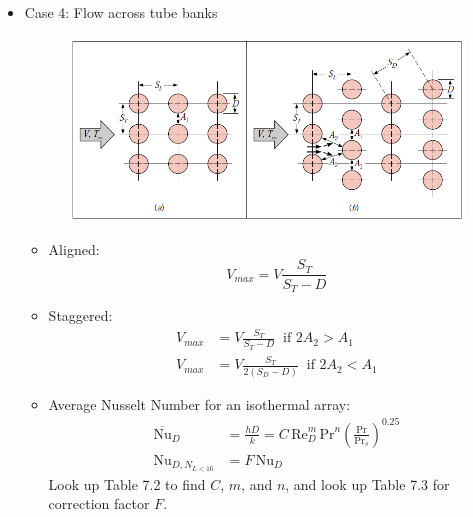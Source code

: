 \begin{itemize}
    \item Case 4: \color{red} Flow across tube banks \color{black}
    \begin{figure}[H]
        \centering
        \includegraphics[width=1.0\linewidth]{images/tube_bank.png}
    \end{figure}
    \begin{itemize}
        \item Aligned:
        \begin{equation*}
            V_{max} = V \frac{S_T}{S_T-D}
        \end{equation*}
        \item Staggered:
        \begin{align*}
            V_{max} &= V \frac{S_T}{S_T - D} \; \; \text{if 2$A_2>A_1$} \\
            V_{max} &= V \frac{S_T}{2(S_D - D)}\;\; \text{if 2$A_2<A_1$}
        \end{align*}
        \item Average Nusselt Number for an isothermal array:
        \begin{align*}
            \overline{\text{Nu}}_D &= \frac{hD}{k} = C \,\text{Re}^m_D \, \text{Pr}^n \left(\frac{\text{Pr}}{\text{Pr}_s}\right)^{0.25}\\
            \text{Nu}_{D,N_{L<16}} &= F \, \text{Nu}_D
        \end{align*}
        Look up Table 7.2 to find $C$, $m$, and $n$, and look up Table 7.3 for correction factor $F$.
    \end{itemize}
\end{itemize}
